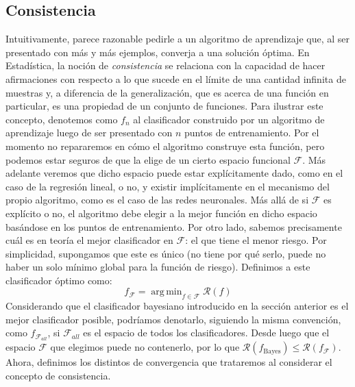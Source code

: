 \documentclass{report}
\DeclareMathOperator*{\argmin}{arg\,min}
\begin{document}
\subsection{Consistencia}
Intuitivamente, parece razonable pedirle a un algoritmo de aprendizaje que, al ser presentado con más y más ejemplos, converja a una
solución óptima. En Estadística, la noción de \textit{consistencia} se relaciona con la capacidad de hacer afirmaciones con respecto a lo que
sucede en el límite de una cantidad infinita de muestras y, a diferencia de la generalización, que es acerca de una función en particular,
es una propiedad de un conjunto de funciones. Para ilustrar este concepto, denotemos como $f_n$ al clasificador construido por un algoritmo
de aprendizaje luego de ser presentado con $n$ puntos de entrenamiento. Por el momento no repararemos en cómo el algoritmo construye esta
función, pero podemos estar seguros de que la elige de un cierto espacio funcional $\mathcal{F}$. Más adelante veremos que dicho espacio puede
estar explícitamente dado, como en el caso de la regresión lineal, o no, y existir implícitamente en el mecanismo del propio algoritmo,
como es el caso de las redes neuronales. Más allá de si $\mathcal{F}$ es explícito o no, el algoritmo debe elegir a la mejor función
en dicho espacio basándose en los puntos de entrenamiento. Por otro lado, sabemos precisamente cuál es en teoría el mejor clasificador
en $\mathcal{F}$: el que tiene el menor riesgo. Por simplicidad, supongamos que este es único (no tiene por qué serlo, puede no haber
un solo mínimo global para la función de riesgo). Definimos a este clasificador óptimo como:
\[
f_{\mathcal{F}} = \argmin _{f\in{\mathcal{F}}} \mathcal{R}(f)
\]
Considerando que el clasificador bayesiano introducido en la sección anterior es el mejor clasificador posible, podríamos denotarlo,
siguiendo la misma convención, como $f_{\mathcal{F}_{all}}$, si $\mathcal{F}_{all}$ es el espacio de todos los clasificadores. Desde luego
que el espacio $\mathcal{F}$ que elegimos
puede no contenerlo, por lo que $\mathcal{R}(f_{\text{Bayes}}) \leq \mathcal{R}(f_{\mathcal{F}})$.
Ahora, definimos los distintos de convergencia que trataremos al considerar el concepto de consistencia.
\end{document}
